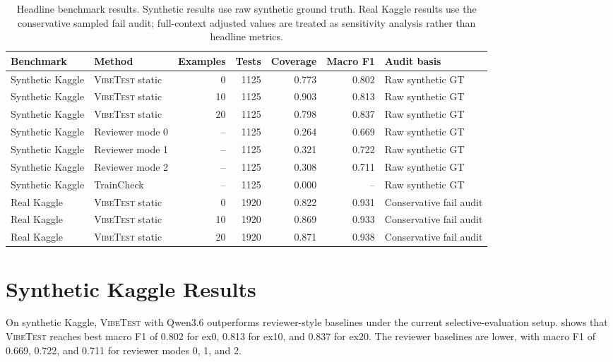 \documentclass[11pt]{article}
\newcommand{\vibetest}{\textsc{VibeTest}}
\newcommand{\qwen}{Qwen3.6}
\begin{document}
\begin{table}[t]
  \centering
  \small
  \begin{tabular}{llrrrrl}
    \toprule
    Benchmark & Method & Examples & Tests & Coverage & Macro F1 & Audit basis \\
    \midrule
    Synthetic Kaggle & \vibetest{} static & 0 & 1125 & 0.773 & 0.802 & Raw synthetic GT \\
    Synthetic Kaggle & \vibetest{} static & 10 & 1125 & 0.903 & 0.813 & Raw synthetic GT \\
    Synthetic Kaggle & \vibetest{} static & 20 & 1125 & 0.798 & 0.837 & Raw synthetic GT \\
    Synthetic Kaggle & Reviewer mode 0 & -- & 1125 & 0.264 & 0.669 & Raw synthetic GT \\
    Synthetic Kaggle & Reviewer mode 1 & -- & 1125 & 0.321 & 0.722 & Raw synthetic GT \\
    Synthetic Kaggle & Reviewer mode 2 & -- & 1125 & 0.308 & 0.711 & Raw synthetic GT \\
    Synthetic Kaggle & TrainCheck & -- & 1125 & 0.000 & -- & Raw synthetic GT \\
    Real Kaggle & \vibetest{} static & 0 & 1920 & 0.822 & 0.931 & Conservative fail audit \\
    Real Kaggle & \vibetest{} static & 10 & 1920 & 0.869 & 0.933 & Conservative fail audit \\
    Real Kaggle & \vibetest{} static & 20 & 1920 & 0.871 & 0.938 & Conservative fail audit \\
    \bottomrule
  \end{tabular}
  \caption{Headline benchmark results. Synthetic results use raw synthetic ground truth. Real Kaggle results use the conservative sampled fail audit; full-context adjusted values are treated as sensitivity analysis rather than headline metrics.}
  \label{tab:headline}
\end{table}

\section{Synthetic Kaggle Results}
\label{sec:synthetic-results}

On synthetic Kaggle, \vibetest{} with \qwen{} outperforms reviewer-style baselines under the current selective-evaluation setup.
 shows that \vibetest{} reaches best macro F1 of 0.802 for ex0, 0.813 for ex10, and 0.837 for ex20.
The reviewer baselines are lower, with macro F1 of 0.669, 0.722, and 0.711 for reviewer modes 0, 1, and 2.
\end{document}
